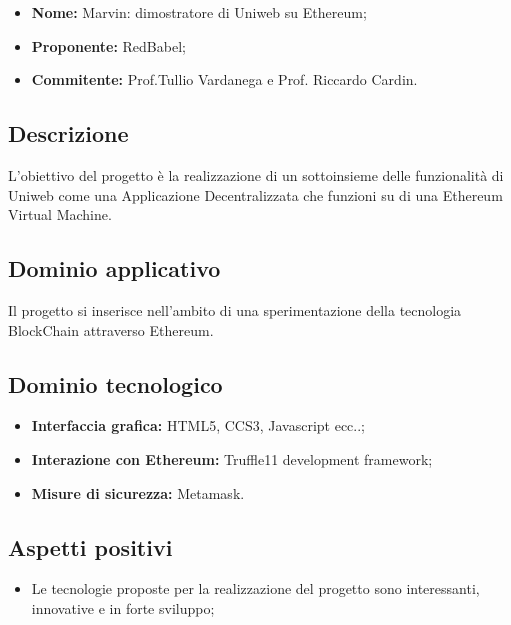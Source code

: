 \documentclass[openany,12pt,a4paper]{report}
\begin{document}
\begin{itemize}
    \item \textbf{Nome:} Marvin: dimostratore di Uniweb su Ethereum;
    \item \textbf{Proponente:} RedBabel;
    \item \textbf{Commitente:} Prof.Tullio Vardanega e Prof. Riccardo Cardin.
\end{itemize}

\subsection{Descrizione}

L'obiettivo del progetto è la realizzazione di un sottoinsieme delle funzionalità di Uniweb come una Applicazione Decentralizzata che funzioni su di una Ethereum Virtual Machine.  

\subsection{Dominio applicativo}

Il progetto si inserisce nell'ambito di una sperimentazione della tecnologia BlockChain attraverso Ethereum.

\subsection{Dominio tecnologico}

\begin{itemize}
    \item \textbf{Interfaccia grafica:} HTML5, CCS3, Javascript ecc..;
    
    \item \textbf{Interazione con Ethereum:} Truffle11 development framework;
    
    \item \textbf{Misure di sicurezza:} Metamask.
\end{itemize}

\subsection{Aspetti positivi}

\begin{itemize}
    \item Le tecnologie proposte per la realizzazione del progetto sono interessanti, innovative e in forte sviluppo;
\end{itemize}
\end{document}
